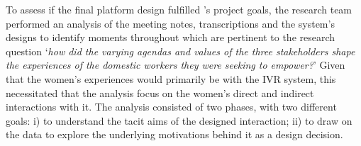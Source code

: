 To assess if the final platform design fulfilled \NGO{}'s project goals, the research team performed an analysis of the meeting notes, transcriptions and the system's designs to identify moments throughout which are pertinent to the research question `\textit{how did the varying agendas and values of the three stakeholders shape the experiences of the domestic workers they were seeking to empower?}' Given that the women's experiences would primarily be with the IVR system, this necessitated that the analysis focus on the women's direct and indirect interactions with it. The analysis consisted of two phases, with two different goals: i) to understand the tacit aims of the designed interaction; ii) to draw on the data to explore the underlying motivations behind it as a design decision. 
